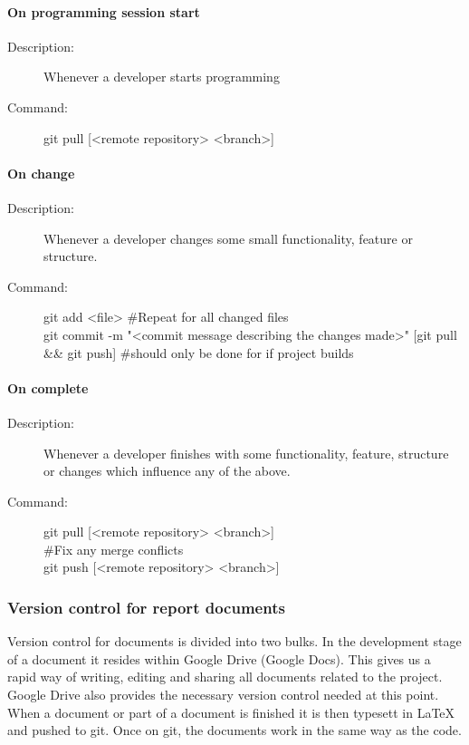 \paragraph{On programming session start}
\begin{description}
\item[Description:] Whenever a developer starts programming
\item[Command:] git pull [<remote repository> <branch>]
\end{description}

\paragraph{On change}
\begin{description}
\item[Description:] Whenever a developer changes some small functionality, feature or structure.
\item[Command:] git add <file> \#Repeat for all changed files \\ git commit -m "<commit message describing the changes 				made>"
			 [git pull \&\& git push] \#should only be done for if project builds
\end{description}

\paragraph{On complete}
\begin{description}
\item[Description:]  Whenever a developer finishes with some functionality, feature,  structure or changes which influence 				any of the above.
\item[Command:]  git pull [<remote repository> <branch>] \\  \#Fix any merge conflicts \\ git push [<remote repository> <branch>]
\end{description}

\subsubsection{Version control for report documents}
Version control for documents is divided into two bulks. In the development stage of a document it resides within Google Drive (Google Docs). This gives us a rapid way of writing, editing and sharing all documents related to the project. Google Drive also provides the necessary version control needed at this point. When a document or part of a document is finished it is then typesett in LaTeX and pushed to git. Once on git, the documents work in the same way as the code.  


